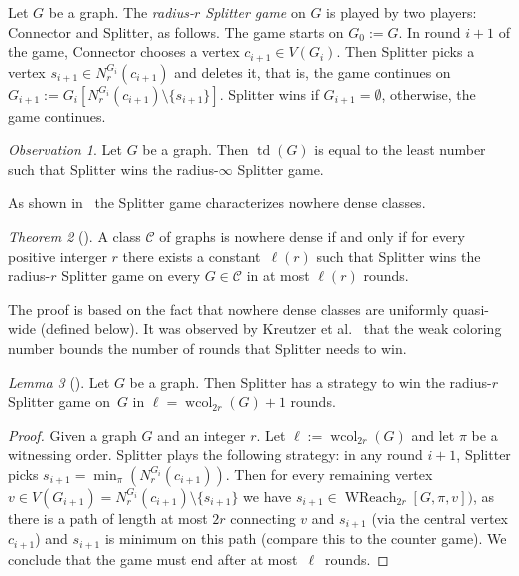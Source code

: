 \documentclass[1p,number,a4paper]{elsarticle}
\theoremstyle{remark}
\newcommand{\Cc}{\mathscr{C}}
\DeclareMathOperator{\td}{td}
\DeclareMathOperator{\wcol}{wcol}
\DeclareMathOperator{\WReach}{WReach}
\newtheorem{theorem}{Theorem}[section]
\newtheorem{lemma}[theorem]{Lemma}
\newtheorem{observation}[theorem]{Observation}
\begin{document}
\smallskip
Let $G$ be a graph. The \emph{radius-$r$ Splitter game} on $G$ is played by two players: Connector and Splitter, as follows.
The game starts on $G_0 := G$. 
In round $i+1$ of the game, Connector chooses a vertex $c_{i+1} \in V(G_i)$.
Then Splitter picks a vertex $s_{i+1} \in N_r^{G_i} (c_{i+1})$ and deletes it, that is, the game continues on $G_{i+1} := G_i[N_r^{G_i} (c_{i+1}) \setminus
\{s_{i+1}\}]$.
Splitter wins if $G_{i+1} = \emptyset$, otherwise, the game continues.

\begin{observation}
  Let $G$ be a graph. Then $\td(G)$ is equal to the least number such that Splitter wins the radius-$\infty$ Splitter game. 
\end{observation}

As shown in~\cite{grohe2017deciding} the Splitter game characterizes nowhere dense classes. 

\begin{theorem}
  [\cite{grohe2017deciding}]
  A class $\Cc$ of graphs is nowhere dense if and only if for every positive interger $r$ there exists a constant~$\ell(r)$ such that Splitter wins the radius-$r$ Splitter game on every $G\in \Cc$ in at most $\ell(r)$ rounds. 
\end{theorem}

The proof is based on the fact that nowhere dense classes are uniformly quasi-wide (defined below). 
It was observed by Kreutzer et al.~\cite{KreutzerPRS16} that the weak coloring number bounds the number of rounds that Splitter needs to win.

\begin{lemma}[\cite{KreutzerPRS16}]
  Let $G$ be a graph. Then Splitter has a strategy to win the radius-$r$ Splitter game on~$G$ in $\ell=\wcol_{2r}(G)+1$ rounds.
\end{lemma}
\begin{proof}
  Given a graph $G$ and an integer $r$. Let $\ell := \wcol_{2r}(G)$ and let $\pi$ be a witnessing order. 
  Splitter plays the following strategy: in any round $i+1$, Splitter picks $s_{i+1}=\min_{\pi}(N_r^{G_i}(c_{i+1}))$. 
  Then for every remaining vertex $v\in V(G_{i+1})=N_r^{G_i}(c_{i+1})\setminus \{s_{i+1}\}$ we have $s_{i+1}\in \WReach_{2r}[G,\pi,v])$, as there is a path of length at most $2r$ connecting $v$ and $s_{i+1}$ (via the central vertex $c_{i+1}$) and $s_{i+1}$ is minimum on this path (compare this to the counter game). 
  We conclude that the game must end after at most~$\ell$~rounds. 
\end{proof}
\end{document}
